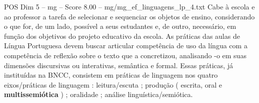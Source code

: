 \begin{textsample}{POS Dim 5 – mg – Score 8.00 – mg/mg\_ef\_linguagens\_lp\_4.txt}
Cabe à escola e ao professor a tarefa de selecionar e sequenciar os objetos de ensino, considerando o que for, de um lado, possível a seus estudantes e, de outro, necessário, em função dos objetivos do projeto educativo da escola.
As práticas das aulas de Língua Portuguesa devem buscar articular competência de uso da língua com a competência de reflexão sobre o texto que a concretizou, analisando -o em suas dimensões discursivas ou interativas, semântica e formal.
Essas práticas, já instituídas na BNCC, consistem em práticas de linguagem nos quatro eixos/práticas de linguagem : leitura/escuta ; produção ( escrita, oral e \textbf{multissemiótica} ) ; oralidade ; análise linguística/semiótica.

\end{textsample}
